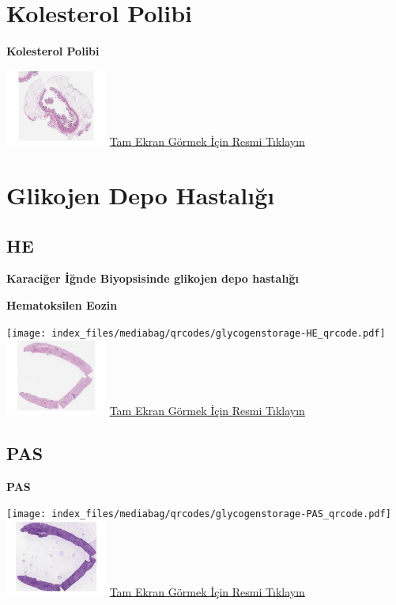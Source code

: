 \documentclass[
  letterpaper,
  DIV=11,
  numbers=noendperiod]{scrreprt}
\begin{document}
\section{Kolesterol Polibi}\label{sec-kolesterol-polibi}

\textbf{Kolesterol Polibi}

\href{https://images.patolojiatlasi.com/cholesterolpolyp/HE.html}{\includegraphics[width=0.25\textwidth,height=\textheight]{./screenshots/thumbnail_cholesterolpolyp.png}}
\href{https://images.patolojiatlasi.com/cholesterolpolyp/HE.html}{Tam
Ekran Görmek İçin Resmi Tıklayın}

\section{Glikojen Depo Hastalığı}\label{sec-glikojen-depo-hastaligi}

\subsection{HE}\label{he}

\textbf{Karaciğer İğnde Biyopsisinde glikojen depo hastalığı}

\textbf{Hematoksilen Eozin}

\texttt{[image: index\_files/mediabag/qrcodes/glycogenstorage-HE\_qrcode.pdf]}
\href{https://images.patolojiatlasi.com/glycogenstorage/HE.html}{\includegraphics[width=0.25\textwidth,height=\textheight]{./screenshots/thumbnail_glycogenstorage-HE.png}}
\href{https://images.patolojiatlasi.com/glycogenstorage/HE.html}{Tam
Ekran Görmek İçin Resmi Tıklayın}

\subsection{PAS}\label{pas}

\textbf{PAS}

\texttt{[image: index\_files/mediabag/qrcodes/glycogenstorage-PAS\_qrcode.pdf]}
\href{https://images.patolojiatlasi.com/glycogenstorage/PAS.html}{\includegraphics[width=0.25\textwidth,height=\textheight]{./screenshots/thumbnail_glycogenstorage-PAS.png}}
\href{https://images.patolojiatlasi.com/glycogenstorage/PAS.html}{Tam
Ekran Görmek İçin Resmi Tıklayın}
\end{document}
